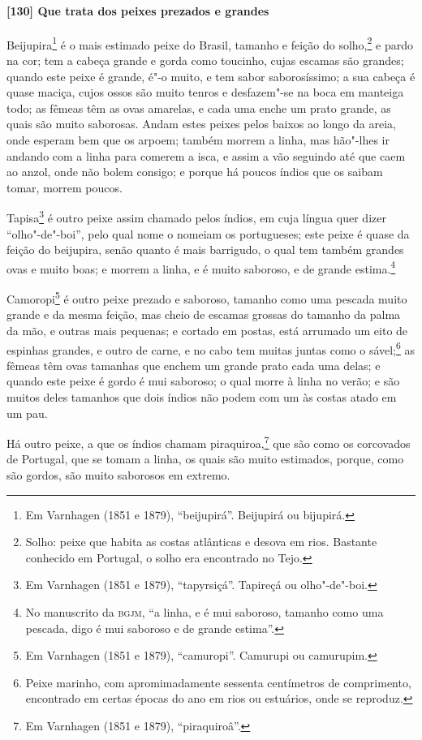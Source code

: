 \begin{linenumbers}
\paragraph{[130] Que trata dos peixes prezados e grandes}\quad
Beijupira\footnote{ Em Varnhagen (1851 e 1879), ``beijupirá''. Beijupirá ou bijupirá.} é o
mais estimado peixe do Brasil, tamanho e feição do solho,\footnote{ Solho: peixe que habita
as costas atlânticas e desova em rios. Bastante conhecido em Portugal, o solho era
encontrado no Tejo.} e pardo na cor; tem a cabeça grande e gorda como toucinho, cujas
escamas são grandes; quando este peixe é grande, é"-o muito, e tem sabor saborosíssimo; a
sua cabeça é quase maciça, cujos ossos são muito tenros e desfazem"-se na boca em manteiga
todo; as fêmeas têm as ovas amarelas, e cada uma enche um prato grande, as quais são muito
saborosas. Andam estes peixes pelos baixos ao longo da areia, onde esperam bem que os
arpoem; também morrem a linha, mas hão"-lhes ir andando com a linha para comerem a isca, e
assim a vão seguindo até que caem ao anzol, onde não bolem consigo; e porque há poucos
índios que os saibam tomar, morrem poucos.

Tapisa\footnote{ Em Varnhagen (1851 e 1879), ``tapyrsiçá''. Tapireçá ou olho"-de"-boi.} é
outro peixe assim chamado pelos índios, em cuja língua quer dizer ``olho"-de"-boi'', pelo
qual nome o nomeiam os portugueses; este peixe é quase da feição do beijupira, senão
quanto é mais barrigudo, o qual tem também grandes ovas e muito boas; e morrem a linha, e
é muito saboroso, e de grande estima.\footnote{ No manuscrito da \textsc{bgjm}, ``a linha,
e é mui saboroso, tamanho como uma pescada, digo é mui saboroso e de grande estima''.}

Camoropi\footnote{ Em Varnhagen (1851 e 1879), ``camuropi''. Camurupi ou camurupim.} é
outro peixe prezado e saboroso, tamanho como uma pescada muito grande e da mesma feição,
mas cheio de escamas grossas do tamanho da palma da mão, e outras mais pequenas; e cortado
em postas, está arrumado um eito de espinhas grandes, e outro de carne, e no cabo tem
muitas juntas como o sável;\footnote{ Peixe marinho, com apromimadamente sessenta centímetros de
comprimento, encontrado em certas épocas do ano em rios ou estuários, onde se reproduz.}
as fêmeas têm ovas tamanhas que enchem um grande prato cada uma delas; e quando este peixe
é gordo é mui saboroso; o qual morre à linha no verão; e são muitos deles tamanhos que
dois índios não podem com um às costas atado em um pau.

Há outro peixe, a que os índios chamam piraquiroa,\footnote{ Em Varnhagen (1851 e 1879),
``piraquiroâ''.} que são como os corcovados de Portugal, que se tomam a linha, os quais
são muito estimados, porque, como são gordos, são muito saborosos em extremo.


\end{linenumbers}
